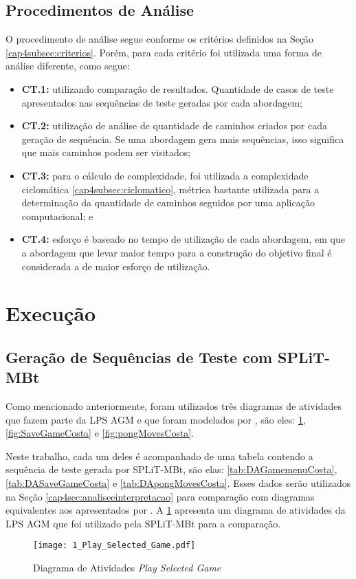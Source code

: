 \subsection{Procedimentos de Análise}

O procedimento de análise segue conforme os critérios definidos na Seção \ref{cap4subsec:criterios}. Porém, para cada critério foi utilizada uma forma de análise diferente, como segue:
\begin{itemize}
	\item \textbf{CT.1:} utilizando comparação de resultados. Quantidade de casos de teste apresentados nas sequências de teste geradas por cada abordagem;
	\item \textbf{CT.2:} utilização de análise de quantidade de caminhos criados por cada geração de sequência. Se uma abordagem gera mais sequências, isso significa que mais caminhos podem ser visitados;
	\item \textbf{CT.3:} para o cálculo de complexidade, foi utilizada a complexidade ciclomática \ref{cap4subsec:ciclomatico}, métrica bastante utilizada para a determinação da quantidade de caminhos seguidos por uma aplicação computacional; e
	\item \textbf{CT.4:} esforço é baseado no tempo de utilização de cada abordagem, em que a abordagem que levar maior tempo para a construção do objetivo final é considerada a de maior esforço de utilização.
\end{itemize}


\section{Execução}
\label{cap4sec:execucaocomparativo}

\subsection{Geração de Sequências de Teste com SPLiT-MBt}
\label{cap4:subsubsec:diagrama_atividade}
Como mencionado anteriormente, foram utilizados três diagramas de atividades que fazem parte da LPS AGM e que foram modelados por \citet{costa2016split}, são eles: \ref{fig:GamemenuCosta}, \ref{fig:SaveGameCosta} e \ref{fig:pongMovesCosta}.

Neste trabalho, cada um deles é acompanhado de uma tabela contendo a sequência de teste gerada por SPLiT-MBt, são elas: \ref{tab:DAGamemenuCosta}, \ref{tab:DASaveGameCosta} e \ref{tab:DApongMovesCosta}. Esses dados serão utilizados na Seção \ref{cap4sec:analiseeinterpretacao} para comparação com diagramas equivalentes aos apresentados por \citet{costa2016split}. 
A \ref{fig:GamemenuCosta} apresenta um diagrama de atividades da LPS AGM que foi utilizado pela SPLiT-MBt para a comparação. 
\newpage
\begin{figure}[H]
	\centering
	\texttt{[image: 1\_Play\_Selected\_Game.pdf]}
	\caption{Diagrama de Atividades \textit{Play Selected Game} \cite{costa2016split}}
	\label{fig:GamemenuCosta}
\end{figure}

